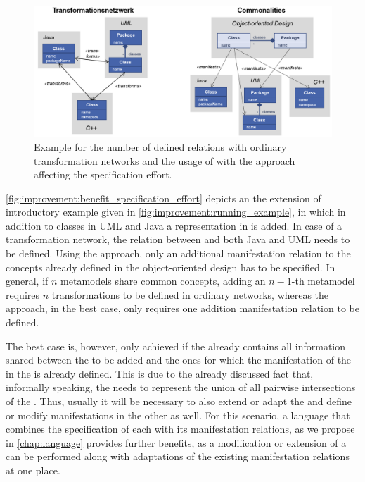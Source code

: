 \begin{figure}
    \centering
    \includegraphics[width=\textwidth]{figures/quality/improvement/benefit_specification_effort.png}
    \caption[Benefit of \commonalities regarding specification effort]{Example for the number of defined relations with ordinary transformation networks and the usage of \conceptmetamodels with the \commonalities approach affecting the specification effort.}
    \label{fig:improvement:benefit_specification_effort}
\end{figure}

\autoref{fig:improvement:benefit_specification_effort} depicts an the extension of introductory example given in \autoref{fig:improvement:running_example}, in which in addition to classes in \gls{UML} and Java a representation in \cplusplus is added.
In case of a transformation network, the relation between \cplusplus and both Java and \gls{UML} needs to be defined.
Using the \commonalities approach, only an additional manifestation relation to the concepts already defined in the object-oriented design \conceptmetamodels has to be specified.
In general, if $n$ metamodels share common concepts, adding an $n-1$-th metamodel requires $n$ transformations to be defined in ordinary networks, whereas the \commonalities approach, in the best case, only requires one addition manifestation relation to be defined.

The best case is, however, only achieved if the \conceptmetamodel already contains all information shared between the \concretemetamodel to be added and the ones for which the manifestation of the \commonalities in the \conceptmetamodel is already defined.
This is due to the already discussed fact that, informally speaking, the \conceptmetamodel needs to represent the union of all pairwise intersections of the \concretemetamodels.
Thus, usually it will be necessary to also extend or adapt the \conceptmetamodel and define or modify manifestations in the other \concretemetamodels as well.
For this scenario, a language that combines the specification of each \commonality with its manifestation relations, as we propose in \autoref{chap:language} provides further benefits, as a modification or extension of a \commonality can be performed along with adaptations of the existing manifestation relations at one place.

